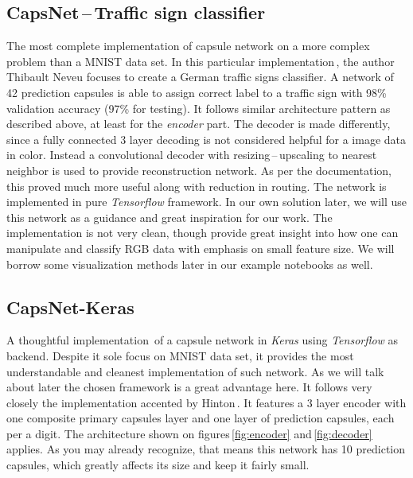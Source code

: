 \subsection{CapsNet\,--\,Traffic sign classifier}
\label{ss:traffic_signs}

The most complete implementation of capsule network on a more complex problem than a MNIST data set. In this particular implementation\,\cite{capsnet_traffic}, the author Thibault Neveu focuses to create a German traffic signs classifier. A network of 42 prediction capsules is able to assign correct label to a traffic sign with 98\% validation accuracy (97\% for testing). It follows similar architecture pattern as described above, at least for the \textit{encoder} part. The decoder is made differently, since a fully connected 3 layer decoding is not considered helpful for a image data in color. Instead a convolutional decoder with resizing\,--\,upscaling to nearest neighbor is used to provide reconstruction network. As per the documentation, this proved much more useful along with reduction in routing. The network is implemented in pure \textit{Tensorflow} framework. In our own solution later, we will use this network as a guidance and great inspiration for our work. The implementation is not very clean, though provide great insight into how one can manipulate and classify RGB data with emphasis on small feature size. We will borrow some visualization methods later in our example notebooks as well.

\subsection{CapsNet-Keras}

A thoughtful implementation\,\cite{capsnet_keras} of a capsule network in \textit{Keras} using \textit{Tensorflow} as backend. Despite it sole focus on MNIST data set, it provides the most understandable and cleanest implementation of such network. As we will talk about later the chosen framework is a great advantage here. It follows very closely the implementation accented by Hinton\,\cite{capsule}. It features a 3 layer encoder with one composite primary capsules layer and one layer of prediction capsules, each per a digit. The architecture shown on figures\,\ref{fig:encoder} and\,\ref{fig:decoder} applies. As you may already recognize, that means this network has 10 prediction capsules, which greatly affects its size and keep it fairly small.



